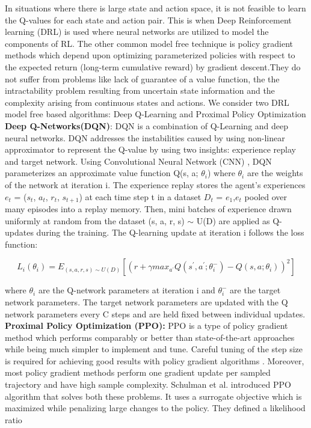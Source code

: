 \documentclass[12pt]{report}
\begin{document}
In situations where there is large state and action space, it is not feasible to learn the Q-values for each state and action pair. This is when Deep Reinforcement learning (DRL) is used where neural networks are utilized to model the components of RL. The other common model free technique is policy gradient methods which depend upon optimizing parameterized policies with respect to the expected return (long-term cumulative reward) by gradient descent.They do not suffer from problems like lack of guarantee of a value function, the the intractability problem resulting from uncertain state information and the complexity arising from continuous states and actions. We consider two DRL model free based algorithms: Deep Q-Learning and Proximal Policy Optimization \\
\hfill \break 
\textbf{Deep Q-Networks(DQN)}: DQN is a combination of Q-Learning and deep neural networks. DQN addresses the instabilities caused by using non-linear approximator to represent the Q-value by using two insights: experience replay and target network. 
Using Convolutional Neural Network (CNN) , DQN parameterizes an approximate value function Q(s, a; $\theta_i$) where $\theta_i$ are the weights of the network at iteration i. The experience replay stores the agent’s experiences $e_t$ = ($s_t$, $a_t$, $r_t$, $s_{t+1}$) at each time step t in a dataset $D_t$ = $e_1$,$e_t$ pooled over many episodes into a replay
memory. Then, mini batches of experience drawn uniformly at random from the dataset (s, a, r, s) $\sim$ U(D) are applied as Q-updates during the training. The
Q-learning update at iteration i follows the loss function:

\[ L_i (\theta_i) = E_{(s,a,r,s) \sim U(D) } [(r +  \gamma max_{a^{'}} Q(s^{'}, a^{'} ; \theta_i^{-}) - Q(s,a; \theta_{i}))^2] \]

\hfill \break
where $\theta_i$ are the Q-network parameters at iteration i and $\theta_i^{-}$  are the target network parameters. The target network parameters are updated with the Q network parameters every C steps and are held fixed between individual updates. \\

\hfill \break
\textbf{Proximal Policy Optimization (PPO):} PPO is a type of policy gradient method which performs  comparably or better than state-of-the-art approaches while being much simpler to implement and tune. Careful tuning of the step size is required for achieving good results with policy gradient algorithms \cite{PPO}. Moreover, most policy gradient methods perform one gradient update per sampled trajectory and have high sample complexity. Schulman et al. \cite{Schulman} introduced PPO algorithm that solves both these problems. It uses a surrogate objective which is maximized while penalizing large changes to the policy. 
They defined a likelihood ratio 
\end{document}
